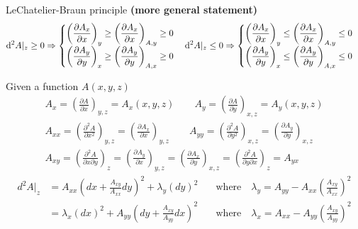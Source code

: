 \begin{principle}
    LeChatelier-Braun principle \textbf{(more general statement)}\label{l-bpg}
    \[
        \mathrm{d}^2A|_z\geq 0\Rightarrow
            \begin{cases}
                \left(\dfrac{\partial A_{x}}{\partial x}\right)_y
                \geq \left(\dfrac{\partial A_{x}}{\partial x}\right)_{A,y}\geq 0\\
                \left(\dfrac{\partial A_{y}}{\partial y}\right)_x
                \geq \left(\dfrac{\partial A_{y}}{\partial y}\right)_{A,x}\geq 0
            \end{cases}
        \hfil
        \mathrm{d}^2A|_z\leq 0\Rightarrow
        \begin{cases}\left(\dfrac{\partial A_{x}}{\partial x}\right)_y
            \leq \left(\dfrac{\partial A_{x}}{\partial x}\right)_{A,y}\leq 0\\
            \left(\dfrac{\partial A_{y}}{\partial y}\right)_x
            \leq \left(\dfrac{\partial A_{y}}{\partial y}\right)_{A,x}\leq 0
        \end{cases}
    \]
\begin{tui}
    Given a function \( A(x, y, z) \)
\begin{gather*}
        A_x = \left( \frac{\partial A}{\partial x} \right)_{y,z} = A_x(x, y, z) 
        \qquad A_y = \left( \frac{\partial A}{\partial y} \right)_{x,z} = A_y(x, y, z)
    \\
        A_{xx} = \left( \frac{\partial^2 A}{\partial x^2} \right)_{y,z} = \left( \frac{\partial A_x}{\partial x} \right)_{y,z} 
        \qquad A_{yy} = \left( \frac{\partial^2 A}{\partial y^2} \right)_{x,z} = \left( \frac{\partial A_y}{\partial y} \right)_{x,z}
    \\
        A_{xy} = \left( \frac{\partial^2 A}{\partial x\partial y} \right)_z = \left( \frac{\partial A_y}{\partial x} \right)_{y,z} = \left( \frac{\partial A_x}{\partial y} \right)_{x,z} = \left( \frac{\partial^2 A}{\partial y\partial x} \right)_z = A_{yx}
\end{gather*}  
\begin{align*}
        d^2A|_z &= A_{xx} \left( dx + \frac{A_{xy}}{A_{xx}} dy \right)^2 + \lambda_y (dy)^2 
        &\quad \text{where} \quad \lambda_y = A_{yy} - A_{xx} \left( \frac{A_{xy}}{A_{xx}} \right)^2
    \\
        &= \lambda_x (dx)^2 + A_{yy} \left( dy + \frac{A_{xy}}{A_{yy}} dx \right)^2 
        &\quad \text{where} \quad \lambda_x = A_{xx} - A_{yy} \left( \frac{A_{xy}}{A_{yy}} \right)^2

\end{align*}
\end{tui}
\end{principle}
